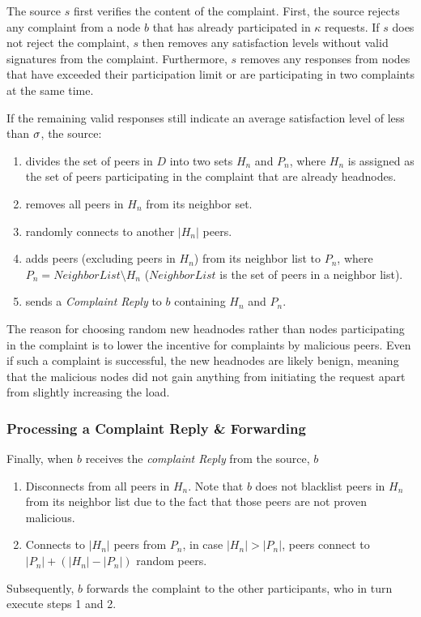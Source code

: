 The source $s$ first verifies the content of the complaint. First, the source rejects any complaint from a node $b$ that has already participated in $\kappa$ requests. 
If $s$ does not reject the complaint, $s$ then removes any satisfaction levels without valid signatures from the complaint.
Furthermore, $s$ removes any responses from nodes that have exceeded their participation limit or are participating in two complaints at the same time. 

If the remaining valid responses still indicate an average satisfaction level of less than $\sigma$, the source:  
\begin{enumerate}
 \item divides the set of peers in $D$ into two sets $H_n$ and $P_n$, where $H_n$ is assigned as the set of peers participating in the complaint that are already headnodes. 
 \item removes all peers in $H_n$ from its neighbor set.
 \item randomly connects to another $|H_n|$ peers. 
 \item adds peers (excluding peers in $H_n$) from its neighbor list to $P_n$, where $P_n = NeighborList\setminus H_n$ ($NeighborList$ is the set of peers in a neighbor list). 
 \item sends a \textit{Complaint Reply} to $b$ containing $H_n$ and $P_n$.
\end{enumerate}
 The reason for choosing random new headnodes rather than nodes participating in the complaint is to lower the incentive for complaints by malicious peers. Even if such a complaint is successful, the new headnodes are likely benign, meaning that the malicious nodes did not gain anything from initiating the request apart from slightly increasing the load. 


\subsubsection*{Processing a Complaint Reply \& Forwarding}

Finally, when $b$ receives the \textit{complaint Reply} from the source, $b$ 
\begin{enumerate}
 \item Disconnects from all peers in $H_n$. Note that $b$ does not blacklist peers in $H_n$ from its neighbor list due to the fact that those peers are not proven malicious.
 \item Connects to $|H_n|$ peers from $P_n$, in case $|H_n|>|P_n|$, peers connect to $|P_n|+(|H_n|-|P_n|)$ random peers.
\end{enumerate}
Subsequently, $b$ forwards the complaint to the other participants, who in turn execute steps 1 and 2.

